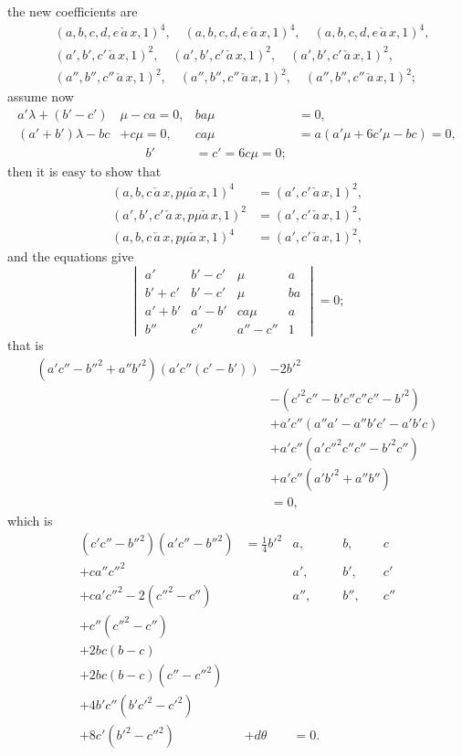 \documentclass[11pt,a4paper]{book}
\begin{document}
the new coefficients are
\begin{align*}
&(a, b, c, d, e\,\check{a}\,x, 1)^4, \quad (a, b, c, d, e\,\check{a}\,x, 1)^4, \quad (a, b, c, d, e\,\check{a}\,x, 1)^4,\\
&(a', b', c'\,\check{a}\,x, 1)^2, \quad (a', b', c'\,\check{a}\,x, 1)^2, \quad (a', b', c'\,\check{a}\,x, 1)^2,\\
&(a'', b'', c''\,\check{a}\,x, 1)^2, \quad (a'', b'', c''\,\check{a}\,x, 1)^2, \quad (a'', b'', c''\,\check{a}\,x, 1)^2;
\end{align*}
assume now
\begin{align*}
a' \lambda + (b' - c')&\mu - ca = 0, & ba\mu &= 0,\\
(a' + b')\lambda - bc &+ c\mu = 0, & ca\mu &= a(a' \mu + 6c'\mu - bc) = 0,\\
&\quad\quad b' &= c' = 6c \mu = 0;
\end{align*}
then it is easy to show that
\begin{align*}
(a, b, c\,\check{a}\,x, p\mu\check{a}\,x, 1)^4 &= (a', c'\,\check{a}\,x, 1)^2,\\
(a', b', c'\,\check{a}\,x, p\mu\check{a}\,x, 1)^2 &= (a', c'\,\check{a}\,x, 1)^2,\\
(a, b, c\,\check{a}\,x, p\mu\check{a}\,x, 1)^4 &= (a', c'\,\check{a}\,x, 1)^2,
\end{align*}
and the equations give
\[
\begin{vmatrix}
a' & b' - c' & \mu & a \\
b' + c' & b' - c' & \mu & ba \\
a' + b' & a' - b' & ca\mu & a \\
b'' & c'' & a'' - c'' & 1
\end{vmatrix} = 0;
\]
that is
\begin{align*}
(a' c'' - b''^2 + a''b'^2)(a' c''(c'-b')) &- 2b'^2 \\
&- (c'^2 c'' - b' c'' c'' c'' - b'^2)\\
&+ a' c'' (a'' a' - a'' b' c' - a' b' c)\\
&+ a' c''(a' c''^2 c'' c'' - b'^2 c'')\\
&+ a' c''(a' b'^2 + a'' b'')\\
&= 0,
\end{align*}
which is
\begin{align*}
(c'c'' - b''^2)(a' c'' - b''^2) &= \tfrac{1}{4}b'^2 & a, & \quad b, & \quad c\\
+ ca'' c''^2 &  & a', & \quad b', & \quad c'\\
+ ca' c''^2 - 2(c''^2 - c'')   &  & a'', & \quad b'', & \quad c''\\
+ c''(c''^2 - c'') &\\
+ 2bc(b - c) &\\
+ 2bc(b - c)(c'' - c''^2)&\\
+ 4b' c''(b' c'^2 - c'^2) &\\
+ 8c'(b'^2 - c''^2) &  + d\theta &= 0.
\end{align*}
\end{document}
